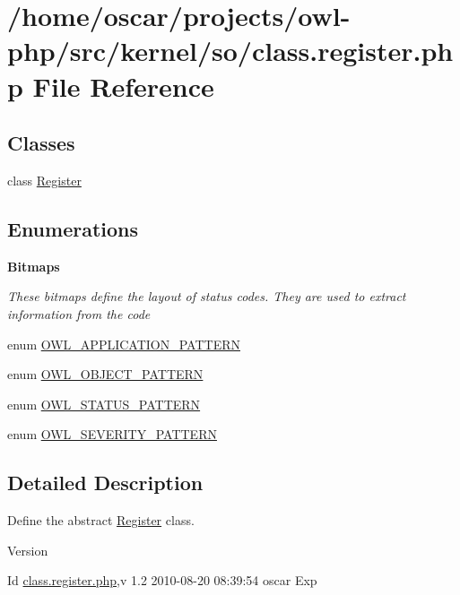 \section{/home/oscar/projects/owl-\/php/src/kernel/so/class.register.php File Reference}
\label{class_8register_8php}
\subsection*{Classes}
\begin{DoxyCompactItemize}
\item 
class \hyperlink{classRegister}{Register}
\end{DoxyCompactItemize}
\subsection*{Enumerations}
\begin{Indent}{\bf Bitmaps}\par
{\em \label{_amgrp2ec9eef022a1b519bdb1040e05224b00}
 These bitmaps define the layout of status codes. They are used to extract information from the code }\begin{DoxyCompactItemize}
\item 
enum \hyperlink{class_8register_8php_a22359c406b8745e8fa2412ec96d5e74c}{OWL\_\-APPLICATION\_\-PATTERN} 
\item 
enum \hyperlink{class_8register_8php_aac5ed52fb1bbffdff69e9a24c40962f5}{OWL\_\-OBJECT\_\-PATTERN} 
\item 
enum \hyperlink{class_8register_8php_a0a8649e9ad7fa654df2c41aa4ba1283c}{OWL\_\-STATUS\_\-PATTERN} 
\item 
enum \hyperlink{class_8register_8php_aeb9363fcaa1cd911762ff88518a9d973}{OWL\_\-SEVERITY\_\-PATTERN} 
\end{DoxyCompactItemize}
\end{Indent}


\subsection{Detailed Description}
Define the abstract \hyperlink{classRegister}{Register} class. \begin{DoxyVersion}{Version}

\end{DoxyVersion}
\begin{DoxyParagraph}{Id}
\hyperlink{class_8register_8php}{class.register.php},v 1.2 2010-\/08-\/20 08:39:54 oscar Exp 
\end{DoxyParagraph}


